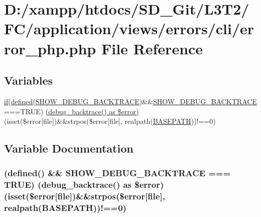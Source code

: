\hypertarget{cli_2error__php_8php}{}\section{D\+:/xampp/htdocs/\+S\+D\+\_\+\+Git/\+L3\+T2/\+F\+C/application/views/errors/cli/error\+\_\+php.php File Reference}
\label{cli_2error__php_8php}
\subsection*{Variables}
\begin{DoxyCompactItemize}
\item 
\hyperlink{excanvas_8js_a409038cddd5fb941140f7ff76f5b7b15}{if}(\hyperlink{_bootstrap_8php_a46458e8654a714e0565e20f63021add9}{defined}(\textquotesingle{}\hyperlink{constants_8php_a7e2dd6fea73799257285946411aeb5ce}{S\+H\+O\+W\+\_\+\+D\+E\+B\+U\+G\+\_\+\+B\+A\+C\+K\+T\+R\+A\+C\+E}\textquotesingle{})\&\&\hyperlink{constants_8php_a7e2dd6fea73799257285946411aeb5ce}{S\+H\+O\+W\+\_\+\+D\+E\+B\+U\+G\+\_\+\+B\+A\+C\+K\+T\+R\+A\+C\+E}===T\+R\+U\+E) \hyperlink{cli_2error__php_8php_acf0b45c2a78b2e3c8689c4cfbe34a63f}{(debug\+\_\+backtrace() as \$error)} (isset(\$error\mbox{[}\textquotesingle{}file\textquotesingle{}\mbox{]})\&\&strpos(\$error\mbox{[}\textquotesingle{}file\textquotesingle{}\mbox{]}, realpath(\hyperlink{index_8php_ad39801cabfd338dc5524466fe793fda9}{B\+A\+S\+E\+P\+A\+T\+H}))!==0)
\end{DoxyCompactItemize}


\subsection{Variable Documentation}
\hypertarget{cli_2error__php_8php_acf0b45c2a78b2e3c8689c4cfbe34a63f}{}
\subsubsection[{(debug\+\_\+backtrace() as \$error)}]{({\bf defined}(\textquotesingle{}) \&\& {\bf S\+H\+O\+W\+\_\+\+D\+E\+B\+U\+G\+\_\+\+B\+A\+C\+K\+T\+R\+A\+C\+E} === T\+R\+U\+E) (debug\+\_\+backtrace() as \$error)(isset(\$error\mbox{[}\textquotesingle{}file\textquotesingle{}\mbox{]})\&\&strpos(\$error\mbox{[}\textquotesingle{}file\textquotesingle{}\mbox{]}, realpath({\bf B\+A\+S\+E\+P\+A\+T\+H}))!==0)}\label{cli_2error__php_8php_acf0b45c2a78b2e3c8689c4cfbe34a63f}
